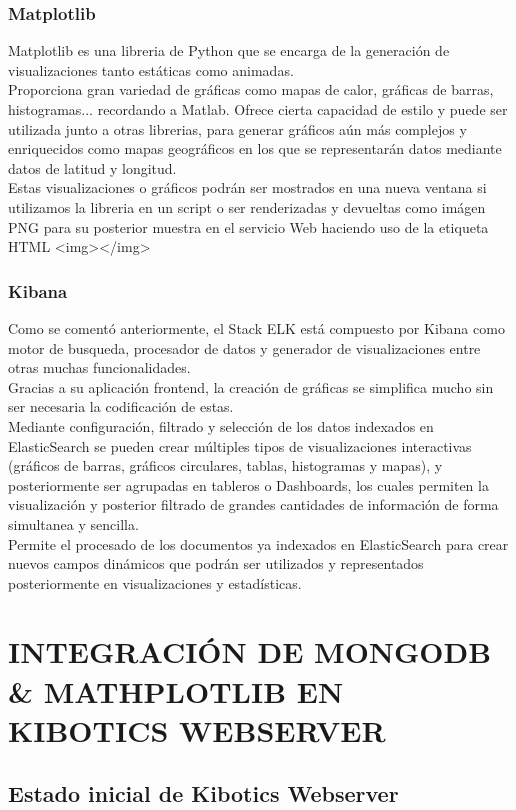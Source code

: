 \documentclass[11pt,a4paper]{book}
\begin{document}
			\subsection{Matplotlib}
				Matplotlib es una libreria de Python que se encarga de la generación de visualizaciones tanto estáticas como animadas. \\
				Proporciona gran variedad de gráficas como mapas de calor, gráficas de barras, histogramas... recordando a Matlab. Ofrece cierta capacidad de estilo y puede ser utilizada junto a otras librerias, para generar gráficos aún más complejos y enriquecidos como mapas geográficos en los que se representarán datos mediante datos de latitud y longitud. \\
				Estas visualizaciones o gráficos podrán ser mostrados en una nueva ventana si utilizamos la libreria en un script o ser renderizadas y devueltas como imágen PNG para su posterior muestra en el servicio Web haciendo uso de la etiqueta HTML <img></img>
			\subsection{Kibana}
				Como se comentó anteriormente, el Stack ELK está compuesto por Kibana como motor de busqueda, procesador de datos y generador de visualizaciones entre otras muchas funcionalidades.\\
				Gracias a su aplicación frontend, la creación de gráficas se simplifica mucho sin ser necesaria la codificación de estas. \\
				Mediante configuración, filtrado y selección de los datos indexados en ElasticSearch se pueden crear múltiples tipos de visualizaciones interactivas (gráficos de barras, gráficos circulares, tablas, histogramas y mapas), y posteriormente ser agrupadas en tableros o Dashboards, los cuales permiten la visualización y posterior filtrado de grandes cantidades de información de forma simultanea y sencilla.\\
				Permite el procesado de los documentos ya indexados en ElasticSearch para crear nuevos campos dinámicos que podrán ser utilizados y representados posteriormente en visualizaciones y estadísticas.
	\chapter{INTEGRACIÓN DE MONGODB \& MATHPLOTLIB EN KIBOTICS WEBSERVER}
		\section{Estado inicial de Kibotics Webserver}
\end{document}
